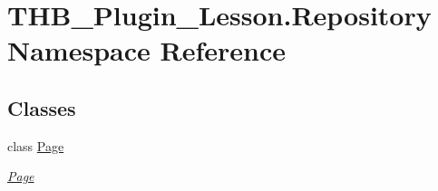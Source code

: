 \hypertarget{namespace_t_h_b___plugin___lesson_1_1_repository}{}\section{T\+H\+B\+\_\+\+Plugin\+\_\+\+Lesson.\+Repository Namespace Reference}
\label{namespace_t_h_b___plugin___lesson_1_1_repository}
\subsection*{Classes}
\begin{DoxyCompactItemize}
\item 
class \mbox{\hyperlink{class_t_h_b___plugin___lesson_1_1_repository_1_1_page}{Page}}
\begin{DoxyCompactList}\small\item\em \mbox{\hyperlink{class_t_h_b___plugin___lesson_1_1_repository_1_1_page}{Page}} \end{DoxyCompactList}\end{DoxyCompactItemize}
